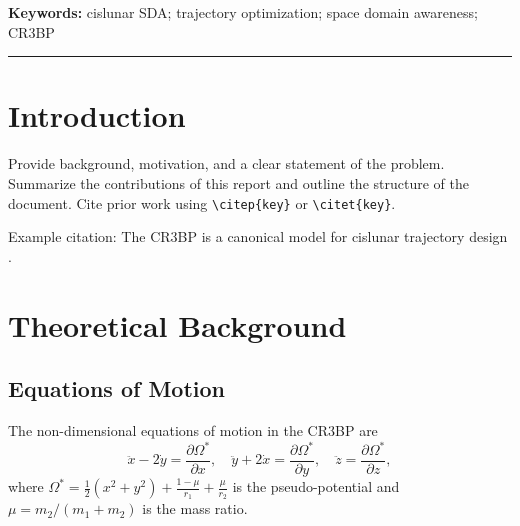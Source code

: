 \documentclass[11pt, letterpaper]{article}
\newcommand{\Keywords}{cislunar SDA; trajectory optimization; space domain awareness; CR3BP}
\begin{document}
\begin{abstract}
\noindent
Replace this text with your abstract (150–250 words). The abstract should concisely state
the motivation, problem formulation, methodology, key results, and conclusion.
Avoid using references or unexplained acronyms in the abstract.
\end{abstract}

\noindent\textbf{Keywords:} \Keywords

\vspace{0.5cm}
{\color{RPIred}\rule{\linewidth}{0.8pt}}

\tableofcontents
\newpage


\section{Introduction}
\label{sec:intro}

Provide background, motivation, and a clear statement of the problem. Summarize the
contributions of this report and outline the structure of the document. Cite prior
work using \texttt{\textbackslash citep\{key\}} or \texttt{\textbackslash citet\{key\}}.

Example citation: The CR3BP is a canonical model for cislunar trajectory design
\citep{szebehely1967theory}.

\section{Theoretical Background}
\label{sec:background}

\subsection{Equations of Motion}
\label{sec:eom}

The non-dimensional equations of motion in the CR3BP are
\begin{equation}
    \ddot{x} - 2\dot{y} = \frac{\partial \Omega^*}{\partial x}, \quad
    \ddot{y} + 2\dot{x} = \frac{\partial \Omega^*}{\partial y}, \quad
    \ddot{z}             = \frac{\partial \Omega^*}{\partial z},
    \label{eq:cr3bp}
\end{equation}
where $\Omega^* = \tfrac{1}{2}(x^2+y^2) + \tfrac{1-\mu}{r_1} + \tfrac{\mu}{r_2}$
is the pseudo-potential and $\mu = m_2/(m_1+m_2)$ is the mass ratio.
\end{document}
